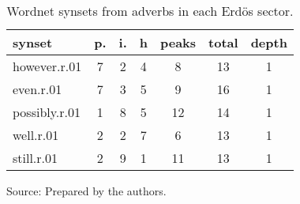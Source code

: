 \begin{table}[h!]
\begin{center}
\caption{Wordnet synsets from adverbs in each Erd\"os sector.}
	\label{tab:wnrh}
\begin{tabular}{| l || c | c | c || c | c | c |}\hline
{\bf synset} & {\bf p.} & {\bf i.} & {\bf h} & {\bf peaks} & {\bf total} & {\bf depth} \\\hline\hline
however.r.01 & 7  & 2  & 4  & 8  & 13  & 1 \\
even.r.01 & 7  & 3  & 5  & 9  & 16  & 1 \\
possibly.r.01 & 1  & 8  & 5  & 12  & 14  & 1 \\
well.r.01 & 2  & 2  & 7  & 6  & 13  & 1 \\
still.r.01 & 2  & 9  & 1  & 11  & 13  & 1 \\\hline
\end{tabular}
\begin{flushleft}
		Source: Prepared by the authors.\
\end{flushleft}
\end{center}
\end{table}
